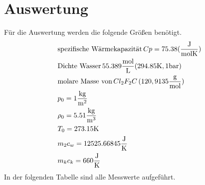 \section{Auswertung}
\label{sec:Auswertung}
Für die Auswertung werden die folgende Größen benötigt.
\begin{align*}
  &\text{spezifische Wärmekapazität}\, Cp=75.38(\si{\frac{\joule}{\mol\kelvin}})  \\
  &\text{Dichte Wasser}\, 55.389\si{\frac{\mol}{\liter}} (294.85 \si{\kelvin,1\bar)}     \\
  &\text{molare Masse von} \, Cl_2F_2C \, (120,9135 \si{\frac{\gram}{\mol}})       \\
  &p_0=1       \si{\frac{\kilo\gram}{\meter^2}}      \\
  &\rho_0=5.51  \si{\frac{\kilo\gram}{\meter^3}}     \\
  &T_0=273.15  \si{\kelvin}                          \\
  &m_2c_w=12525.66845 \si{\frac{\joule}{\kelvin}}    \\
  &m_kc_k=660   \si{\frac{\joule}{\kelvin}}
\end{align*}
In der folgenden Tabelle sind alle Messwerte aufgeführt.
